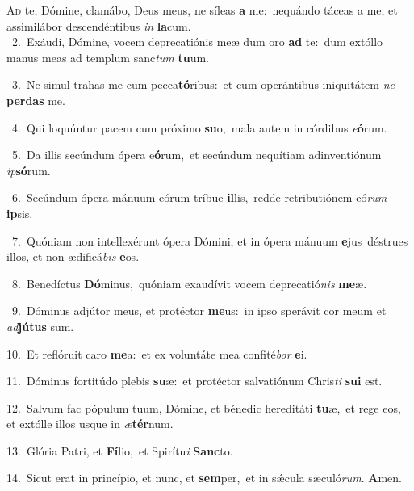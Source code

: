 \lettrine{\initial\textcolor{\initialcolor}{A}}{d} te, Dómine, clamábo, Deus meus, ne síleas \textbf{a} me:~\star nequándo táceas a me, et assimilábor descendéntibus \textit{in} \textbf{la}\-cum.\\
{\numbfont\textcolor{\numbcolor}{~2.}}~Exáudi, Dómine, vocem deprecatiónis meæ dum oro \textbf{ad} te:~\star dum extóllo manus meas ad templum sanc\textit{tum} \textbf{tu}\-um.\par
{\numbfont\textcolor{\numbcolor}{~3.}}~Ne simul trahas me cum pecca\-\textbf{tó}\-ribus:~\star et cum operántibus iniquitátem \textit{ne} \textbf{per}\-\textbf{das} me.\par
{\numbfont\textcolor{\numbcolor}{~4.}}~Qui loquúntur pacem cum próximo \textbf{su}\-o,~\star mala autem in córdibus \textit{e}\-\textbf{ó}rum.\par
{\numbfont\textcolor{\numbcolor}{~5.}}~Da illis secúndum ópera e\-\textbf{ó}\-rum,~\star et secúndum nequítiam adinventiónum \textit{ip}\-\textbf{só}rum.\par
{\numbfont\textcolor{\numbcolor}{~6.}}~Secúndum ópera mánuum eórum tríbue \textbf{il}\-lis,~\star redde retributiónem eó\textit{rum} \textbf{ip}\-sis.\par
{\numbfont\textcolor{\numbcolor}{~7.}}~Quóniam non intellexérunt ópera Dómini, et in ópera mánuum \textbf{e}\-jus~\star déstrues illos, et non ædificá\textit{bis} \textbf{e}\-os.\par
{\numbfont\textcolor{\numbcolor}{~8.}}~Benedíctus \textbf{Dó}\-minus,~\star quóniam exaudívit vocem deprecatió\textit{nis} \textbf{me}\-æ.\par
{\numbfont\textcolor{\numbcolor}{~9.}}~Dóminus adjútor meus, et protéctor \textbf{me}\-us:~\star in ipso sperávit cor meum et \textit{ad}\-\textbf{jú}\textbf{tus} sum.\par
{\numbfont\textcolor{\numbcolor}{10.}}~Et reflóruit caro \textbf{me}\-a:~\star et ex voluntáte mea confité\textit{bor} \textbf{e}\-i.\par
{\numbfont\textcolor{\numbcolor}{11.}}~Dóminus fortitúdo plebis \textbf{su}\-æ:~\star et protéctor salvatiónum Chris\textit{ti} \textbf{su}\-\textbf{i} est.\par
{\numbfont\textcolor{\numbcolor}{12.}}~Salvum fac pópulum tuum, Dómine, et bénedic hereditáti \textbf{tu}\-æ,~\star et rege eos, et extólle illos usque in \textit{æ}\-\textbf{tér}num.\par
{\numbfont\textcolor{\numbcolor}{13.}}~Glória Patri, et \textbf{Fí}\-lio,~\star et Spirítu\textit{i} \textbf{Sanc}\-to.\par
{\numbfont\textcolor{\numbcolor}{14.}}~Sicut erat in princípio, et nunc, et \textbf{sem}\-per,~\star et in sǽcula sæculó\-\textit{rum}\-. \textbf{A}\-men.\par
